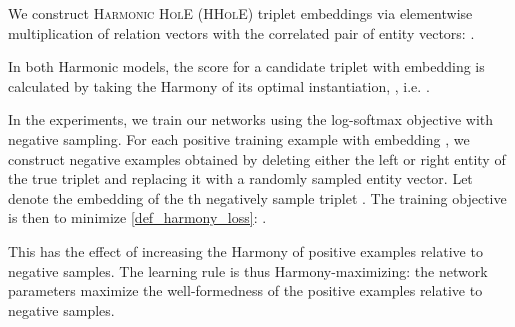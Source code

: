 \documentclass[a4paper,10pt]{article}
\begin{document}
We construct \textsc{Harmonic HolE} (\textsc{HHolE}) triplet embeddings via elementwise multiplication of relation vectors with the correlated pair of entity vectors:
\ex.  \label{def_x_HHolE}


In both Harmonic models, the score for a candidate triplet  with embedding  is calculated by taking the Harmony of its optimal instantiation, , i.e.
\ex. 

In the experiments, we train our networks using the log-softmax objective with negative sampling. For each positive training example  with embedding , we construct  negative examples  obtained by deleting either the left or right entity of the true triplet and replacing it with a randomly sampled entity vector. Let  denote the embedding of the th negatively sample triplet . The training objective is then to minimize \ref{def_harmony_loss}:
\ex. {\small \\
	\phantom{h}\hfill  }\label{def_harmony_loss}

This has the effect of increasing the Harmony of positive examples relative to negative samples. The learning rule is thus Harmony-maximizing: the network parameters maximize the well-formedness of the positive examples relative to negative samples. 
\end{document}
